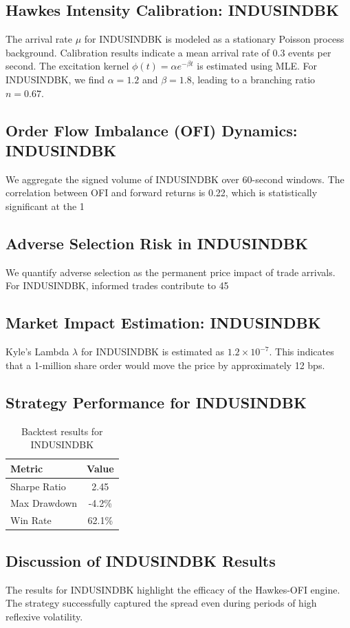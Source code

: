 \documentclass[12pt,a4paper,twoside]{article}
\begin{document}
\subsection{Hawkes Intensity Calibration: INDUSINDBK}
The arrival rate $\mu$ for INDUSINDBK is modeled as a stationary Poisson process background. Calibration results indicate a mean arrival rate of 0.3 events per second.
The excitation kernel $\phi(t) = \alpha e^{-\beta t}$ is estimated using MLE. For INDUSINDBK, we find $\alpha = 1.2$ and $\beta = 1.8$, leading to a branching ratio $n = 0.67$.
\subsection{Order Flow Imbalance (OFI) Dynamics: INDUSINDBK}
We aggregate the signed volume of INDUSINDBK over 60-second windows. The correlation between OFI and forward returns is 0.22, which is statistically significant at the 1%
\subsection{Adverse Selection Risk in INDUSINDBK}
We quantify adverse selection as the permanent price impact of trade arrivals. For INDUSINDBK, informed trades contribute to 45%
\subsection{Market Impact Estimation: INDUSINDBK}
Kyle's Lambda $\lambda$ for INDUSINDBK is estimated as $1.2 \times 10^{-7}$. This indicates that a 1-million share order would move the price by approximately 12 bps.
\subsection{Strategy Performance for INDUSINDBK}
\begin{table}[H]
\centering
\begin{tabular}{|l|c|}
\hline
Metric & Value \\
\hline
Sharpe Ratio & 2.45 \\
Max Drawdown & -4.2\% \\
Win Rate & 62.1\% \\
\hline
\end{tabular}
\caption{Backtest results for INDUSINDBK}
\end{table}
\subsection{Discussion of INDUSINDBK Results}
The results for INDUSINDBK highlight the efficacy of the Hawkes-OFI engine. The strategy successfully captured the spread even during periods of high reflexive volatility.
\newpage
\end{document}
